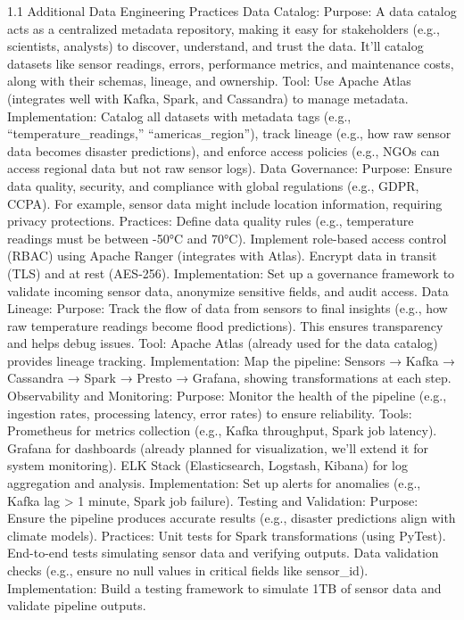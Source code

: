 \documentclass[10pt]{article}
\begin{document}
1.1 Additional Data Engineering Practices
Data Catalog:
Purpose: A data catalog acts as a centralized metadata repository, making it easy for stakeholders (e.g., scientists, analysts) to discover, understand, and trust the data. It’ll catalog datasets like sensor readings, errors, performance metrics, and maintenance costs, along with their schemas, lineage, and ownership.
Tool: Use Apache Atlas (integrates well with Kafka, Spark, and Cassandra) to manage metadata.
Implementation: Catalog all datasets with metadata tags (e.g., “temperature_readings,” “americas_region”), track lineage (e.g., how raw sensor data becomes disaster predictions), and enforce access policies (e.g., NGOs can access regional data but not raw sensor logs).
Data Governance:
Purpose: Ensure data quality, security, and compliance with global regulations (e.g., GDPR, CCPA). For example, sensor data might include location information, requiring privacy protections.
Practices:
Define data quality rules (e.g., temperature readings must be between -50°C and 70°C).
Implement role-based access control (RBAC) using Apache Ranger (integrates with Atlas).
Encrypt data in transit (TLS) and at rest (AES-256).
Implementation: Set up a governance framework to validate incoming sensor data, anonymize sensitive fields, and audit access.
Data Lineage:
Purpose: Track the flow of data from sensors to final insights (e.g., how raw temperature readings become flood predictions). This ensures transparency and helps debug issues.
Tool: Apache Atlas (already used for the data catalog) provides lineage tracking.
Implementation: Map the pipeline: Sensors → Kafka → Cassandra → Spark → Presto → Grafana, showing transformations at each step.
Observability and Monitoring:
Purpose: Monitor the health of the pipeline (e.g., ingestion rates, processing latency, error rates) to ensure reliability.
Tools:
Prometheus for metrics collection (e.g., Kafka throughput, Spark job latency).
Grafana for dashboards (already planned for visualization, we’ll extend it for system monitoring).
ELK Stack (Elasticsearch, Logstash, Kibana) for log aggregation and analysis.
Implementation: Set up alerts for anomalies (e.g., Kafka lag > 1 minute, Spark job failure).
Testing and Validation:
Purpose: Ensure the pipeline produces accurate results (e.g., disaster predictions align with climate models).
Practices:
Unit tests for Spark transformations (using PyTest).
End-to-end tests simulating sensor data and verifying outputs.
Data validation checks (e.g., ensure no null values in critical fields like sensor_id).
Implementation: Build a testing framework to simulate 1TB of sensor data and validate pipeline outputs.
\end{document}
